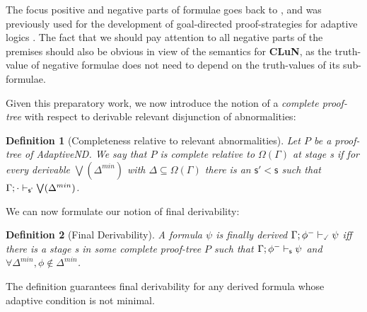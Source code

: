 \documentclass[]{article}
\newtheorem{definition}{Definition}
\newcommand{\Turn}[2]
    { {#1}\vdash_{\textbf{\sf s}}  {#2}}
\newcommand{\TurnPrime}[2]
    { {#1}\vdash_{\textbf{\sf s'}}  {#2}}
\newcommand{\TurnPrimePrime}[2]
    { {#1}\vdash_{\textbf{\sf s''}}  {#2}}
\newcommand{\TurnChecked}[2]
    { {#1}\vdash_{\textbf{\sf \checked}}  {#2}}
\begin{document}
The focus positive and negative parts of formulae goes back to \cite{Sch60}, and was previously used for the development of goal-directed proof-strategies for adaptive logics \cite{Batens:LogiqueAnalyse:2001}. The fact that we should pay attention to all negative parts of the premises should also be obvious in view of the semantics for \textbf{CLuN}, as the truth-value of negative formulae does not need to depend on the truth-values of its sub-formulae.

Given this preparatory work, we now introduce the notion of a \textit{complete proof-tree} with respect to derivable relevant disjunction of abnormalities:

\begin{definition}[Completeness relative to relevant abnormalities]
Let $P$ be a proof-tree of {\sf AdaptiveND}. We say that $P$ is complete relative to $\Omega(\Gamma)$ at stage {\sf s} if for every derivable $\bigvee(\Delta^{min})$ with $\Delta\subseteq\Omega(\Gamma)$ there is an $\mathsf{s' < s}$ such that $\TurnPrime{\Gamma;\cdot}{\bigvee(\Delta^{min})}$.

%
\end{definition}



We can now formulate our notion of final derivability:

\begin{definition}[Final Derivability]
A formula $\psi$ is finally derived $\TurnChecked{\Gamma;\phi^{-}}{\psi}$ iff there is a stage {\sf s}  in some complete proof-tree $P$
 such that $\Turn{\Gamma;\phi^{-}}{\psi}$ and $\forall \Delta^{min},\phi \notin \Delta^{min}$.
\end{definition}
%
The definition guarantees final derivability for any derived formula whose adaptive condition is not minimal. 
\end{document}
